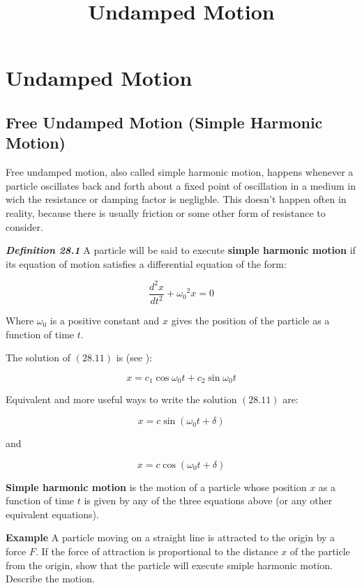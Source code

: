 \documentclass{article}
\title{Undamped Motion}
\begin{document}
\section{Undamped Motion}

\subsection{Free Undamped Motion (Simple Harmonic Motion)}

Free undamped motion, also called simple harmonic motion, happens whenever a particle oscillates back and forth about a fixed point of oscillation in a medium in wich the resistance or damping factor is negligble. This doesn't happen often in reality, because there is usually friction or some other form of resistance to consider.

\emph{\textbf{Definition 28.1}} A particle will be said to execute \textbf{simple harmonic motion} if its equation of motion satisfies a differential equation of the form:

\[ \tag{28.11} \frac{d^2 x}{dt^2} + {\omega_0}^2 x = 0 \]

Where $\omega_0$ is a positive constant and $x$ gives the position of the particle as a function of time $t$.

The solution of $(28.11)$ is (see ):

\[ \tag{28.12} x = c_1 \cos{\omega_0 t} + c_2 \sin{\omega_0 t} \]

Equivalent and more useful ways to write the solution $(28.11)$ are:

\[ \tag{28.13} x = c \sin{(\omega_0 t + \delta)} \]

and

\[ \tag{28.14} x = c \cos{(\omega_0 t + \delta)} \]

\textbf{Simple harmonic motion} is the motion of a particle whose position $x$ as a function of time $t$ is given by any of the three equations above (or any other equivalent equations).

\textbf{Example}
A particle moving on a straight line is attracted to the origin by a force $F$. If the force of attraction is proportional to the distance $x$ of the particle from the origin, show that the particle will execute smiple harmonic motion. Describe the motion.
\end{document}
